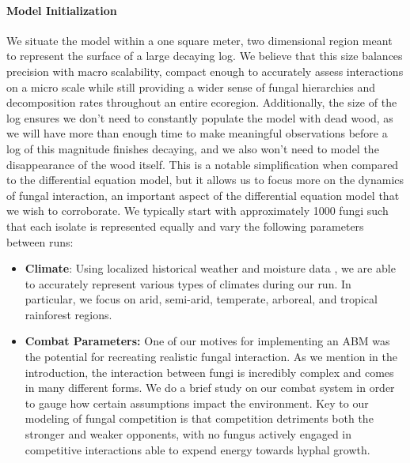 \documentclass[12pt]{article}
\begin{document}
\paragraph{Model Initialization}
We situate the model within a one square meter, two dimensional region meant to represent the surface of a large decaying log. We believe that this size balances precision with macro scalability, 
compact enough to accurately assess interactions on a micro scale while still  
providing a wider sense of fungal hierarchies and decomposition rates throughout an entire ecoregion. 
Additionally, the size of the log ensures we don't need to constantly populate the model with dead wood, as we will have more than enough time to make meaningful observations before a log of this magnitude finishes decaying, and we also won't need to model the disappearance of the wood itself. This is a notable simplification when compared to the differential equation model, but it allows us to focus more on the dynamics of fungal interaction, an important aspect of the differential equation model that we wish to corroborate. We typically start with approximately 1000 fungi such that each isolate is represented equally and vary the following parameters between runs:
\begin{itemize}

\item \textbf{Climate}: Using localized historical weather and moisture data \cite{moisture}, we are able to accurately represent various types of climates during our run. In particular, we focus on arid, semi-arid, temperate, arboreal, and tropical rainforest regions. %
\item \textbf{Combat Parameters:} One of our motives for implementing an ABM was the potential for recreating realistic fungal interaction. As we mention in the introduction, the interaction between fungi is incredibly complex and comes in many different forms. We do a brief study on our combat system in order to gauge how certain assumptions impact the environment. Key to our modeling of fungal competition is that competition detriments both the stronger and weaker opponents, with no fungus actively engaged in competitive interactions able to expend energy towards hyphal growth.  
\end{itemize}
\end{document}
